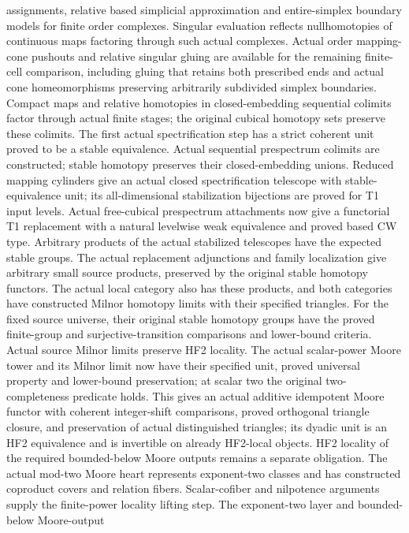 assignments, relative based simplicial approximation and entire-simplex
boundary models for finite order complexes. Singular evaluation reflects
nullhomotopies of continuous maps factoring through such actual complexes.
Actual order mapping-cone pushouts and relative singular gluing are available
for the remaining finite-cell comparison, including gluing that retains both
prescribed ends and actual cone homeomorphisms preserving arbitrarily
subdivided simplex boundaries. Compact maps and relative homotopies in
closed-embedding sequential colimits factor through actual finite stages;
the original cubical homotopy sets preserve these colimits. The first actual
spectrification step has a strict coherent unit proved to be a stable equivalence.
Actual sequential prespectrum colimits are constructed; stable homotopy
preserves their closed-embedding unions. Reduced mapping cylinders give an
actual closed spectrification telescope with stable-equivalence unit; its
all-dimensional stabilization bijections are proved for T1 input levels.
Actual free-cubical prespectrum attachments now give a functorial T1
replacement with a natural levelwise weak equivalence and proved based CW type. Arbitrary products of the actual stabilized telescopes have
the expected stable groups. The actual replacement adjunctions and family localization give arbitrary
small source products, preserved by the original stable homotopy functors. The actual
local category also has these products, and both categories have constructed
Milnor homotopy limits with their specified triangles. For the fixed source
universe, their original stable homotopy groups have the proved finite-group
and surjective-transition comparisons and lower-bound criteria. Actual source
Milnor limits preserve HF2 locality. The actual scalar-power Moore tower
and its Milnor limit now have their specified unit, proved universal
property and lower-bound preservation; at scalar two the original
two-completeness predicate holds. This gives an actual additive idempotent
Moore functor with coherent integer-shift comparisons, proved orthogonal
triangle closure, and preservation of actual distinguished triangles; its dyadic unit is an HF2 equivalence and is invertible
on already HF2-local objects. HF2 locality of the required bounded-below
Moore outputs remains a separate obligation. The actual mod-two Moore heart
represents exponent-two classes and has constructed coproduct covers and
relation fibers. Scalar-cofiber and nilpotence arguments supply the finite-power
locality lifting step. The exponent-two layer and bounded-below Moore-output
